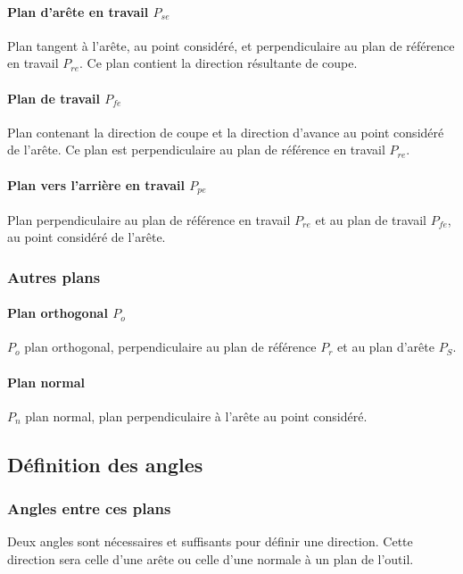 \documentclass[11pt,oneside]{article}
\begin{document}
\paragraph{Plan d'arête en travail $P_{se}$}
Plan tangent à l'arête, au point considéré, et perpendiculaire au plan de référence en travail $P_{re}$. Ce plan contient la direction résultante de coupe. 


\paragraph{Plan de travail $P_{fe}$}
Plan contenant la direction de coupe et la direction d'avance au point considéré de l'arête. Ce plan est perpendiculaire au plan de référence en travail $P_{re}$. 

\paragraph{Plan vers l'arrière en travail $P_{pe}$}  
Plan perpendiculaire au plan de référence en travail $P_{re}$ et au plan de travail $P_{fe}$, au point considéré de l'arête. 


\subsubsection{Autres plans}
\paragraph{Plan orthogonal $P_o$}
$P_o$ plan orthogonal, perpendiculaire au plan de référence $P_r$ et au plan d'arête $P_S$.

\paragraph{Plan normal}
$P_n$ plan normal, plan perpendiculaire à l'arête au point considéré.


\subsection{Définition des angles}
\subsubsection{Angles entre ces plans}
Deux angles sont nécessaires et suffisants pour définir une direction. Cette direction sera celle d’une arête ou celle d’une normale à un plan de l’outil.
\end{document}

